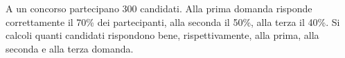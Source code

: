A un concorso partecipano 300 candidati. Alla prima domanda 
risponde correttamente il 70\% dei partecipanti, alla seconda 
il 50\%, alla terza il 40\%. Si calcoli quanti candidati rispondono 
bene, rispettivamente, alla prima, alla seconda e alla terza 
domanda.